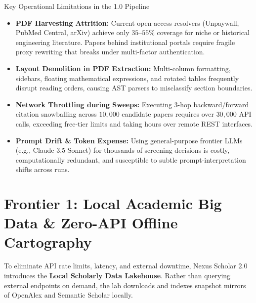 \documentclass[10pt,a4paper]{article}
\begin{document}
\begin{bottleneckbox}{Key Operational Limitations in the 1.0 Pipeline}
\begin{itemize}[leftmargin=1.2em, itemsep=2pt, topsep=1pt]
    \item \textbf{PDF Harvesting Attrition:} Current open-access resolvers (Unpaywall, PubMed Central, arXiv) achieve only $35\text{--}55\%$ coverage for niche or historical engineering literature. Papers behind institutional portals require fragile proxy rewriting that breaks under multi-factor authentication.
    \item \textbf{Layout Demolition in PDF Extraction:} Multi-column formatting, sidebars, floating mathematical expressions, and rotated tables frequently disrupt reading orders, causing AST parsers to misclassify section boundaries.
    \item \textbf{Network Throttling during Sweeps:} Executing 3-hop backward/forward citation snowballing across $10{,}000$ candidate papers requires over $30{,}000$ API calls, exceeding free-tier limits and taking hours over remote REST interfaces.
    \item \textbf{Prompt Drift \& Token Expense:} Using general-purpose frontier LLMs (e.g., Claude 3.5 Sonnet) for thousands of screening decisions is costly, computationally redundant, and susceptible to subtle prompt-interpretation shifts across runs.
\end{itemize}
\end{bottleneckbox}

\newpage
\section{Frontier 1: Local Academic Big Data \& Zero-API Offline Cartography}

To eliminate API rate limits, latency, and external downtime, Nexus Scholar 2.0 introduces the \textbf{Local Scholarly Data Lakehouse}. Rather than querying external endpoints on demand, the lab downloads and indexes snapshot mirrors of OpenAlex and Semantic Scholar locally.
\end{document}
